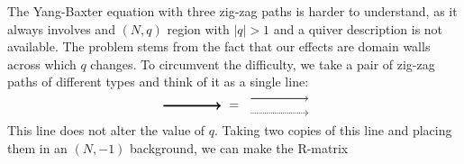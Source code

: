 The Yang-Baxter equation with three zig-zag paths is harder to understand,
as it always involves and $\left( N,q \right)$ region with $\left| q \right|>1$
and a quiver description is not available. The problem stems from
the fact that our effects are domain walls across which $q$ changes.
To circumvent the difficulty, we take a pair of zig-zag paths of different
types and think of it as a single line:
\begin{equation}
    \begin{tikzpicture}[scale=1, baseline=(x.base)]    \node (x) at (0,0) {\vphantom{x}};
        
        \draw[very thick, ->] (0,0) -- (1.6,0);
        
    \end{tikzpicture}
  \ = \ 
    \begin{tikzpicture}[scale=1, baseline=(x.base)]    \node (x) at (0,0) {\vphantom{x}};
        
        \draw[semithick, ->, yshift=0.2cm] (0,0) -- (1.6,0);
        \draw[semithick, densely dotted, ->, yshift=-0.2cm] (0,0) -- (1.6,0);
        
    \end{tikzpicture}
\end{equation}
 This line does not alter the value of $q$. Taking two copies of
this line and placing them in an $\left( N,-1 \right)$ background,
we can make the R-matrix
